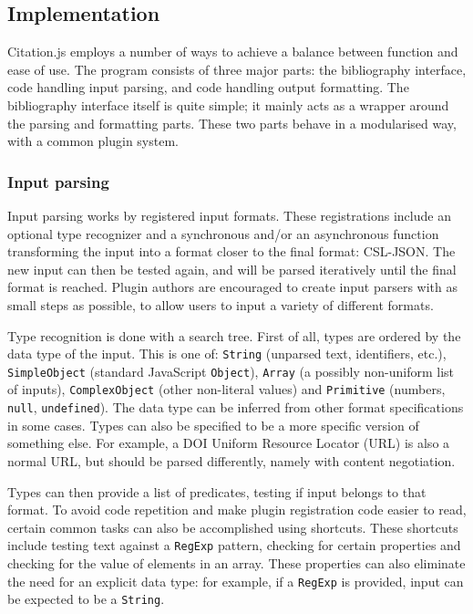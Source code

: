 \documentclass[fleqn,10pt,lineno]{wlpeerj} %
\begin{document}
\subsection*{Implementation}

Citation.js employs a number of ways to achieve a balance between function and ease of use. The program consists of three major parts: the bibliography interface, code handling input parsing, and code handling output formatting. The bibliography interface itself is quite simple; it mainly acts as a wrapper around the parsing and formatting parts. These two parts behave in a modularised way, with a common plugin system.

\subsubsection*{Input parsing}

Input parsing works by registered input formats. These registrations include an optional type recognizer and a synchronous and/or an asynchronous function transforming the input into a format closer to the final format: CSL-JSON. The new input can then be tested again, and will be parsed iteratively until the final format is reached. Plugin authors are encouraged to create input parsers with as small steps as possible, to allow users to input a variety of different formats.

Type recognition is done with a search tree. First of all, types are ordered by the data type of the input. This is one of: \texttt{String} (unparsed text, identifiers, etc.), \texttt{SimpleObject} (standard JavaScript \texttt{Object}), \texttt{Array} (a possibly non-uniform list of inputs), \texttt{ComplexObject} (other non-literal values) and \texttt{Primitive} (numbers, \texttt{null}, \texttt{undefined}). The data type can be inferred from other format specifications in some cases. Types can also be specified to be a more specific version of something else. For example, a DOI Uniform Resource Locator (URL) is also a normal URL, but should be parsed differently, namely with content negotiation.

Types can then provide a list of predicates, testing if input belongs to that format. To avoid code repetition and make plugin registration code easier to read, certain common tasks can also be accomplished using shortcuts. These shortcuts include testing text against a \texttt{RegExp} pattern, checking for certain properties and checking for the value of elements in an array. These properties can also eliminate the need for an explicit data type: for example, if a \texttt{RegExp} is provided, input can be expected to be a \texttt{String}.
\end{document}
